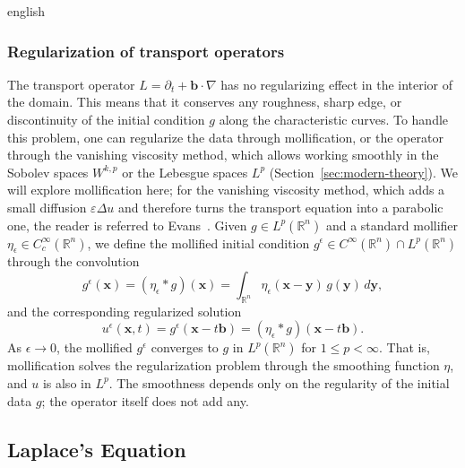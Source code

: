 \documentclass[11pt,letterpaper,twoside,openright]{book} %
\begin{document}
\begin{hyphenrules}{english}
\subsubsection{Regularization of transport operators}
The transport operator $L=\partial_t+\mathbf{b}\cdot\nabla$ has no regularizing effect in the interior of the
domain. This means that it conserves any roughness, sharp edge, or discontinuity of the initial
condition $g$ along the characteristic curves. To handle this problem, one can regularize the data
through mollification, or the operator through the vanishing viscosity method, which allows working
smoothly in the Sobolev spaces $W^{k,p}$ or the Lebesgue spaces $L^p$ (Section~\ref{sec:modern-theory}). We
will explore mollification here; for the vanishing viscosity method, which adds a small diffusion
$\varepsilon\Delta u$ and therefore turns the transport equation into a parabolic one, the reader is
referred to Evans~\cite{evans2010}. Given $g\in L^p(\mathbb{R}^n)$ and a standard mollifier
$\eta_\epsilon\in C_c^\infty(\mathbb{R}^n)$, we define the mollified initial condition
$g^\epsilon\in C^\infty(\mathbb{R}^n)\cap L^p(\mathbb{R}^n)$ through the convolution
\begin{equation}
  g^{\epsilon}(\mathbf{x})=(\eta_\epsilon*g)(\mathbf{x})=\int_{\mathbb{R}^n}\eta_\epsilon(\mathbf{x}-\mathbf{y})\,g(\mathbf{y})\,d\mathbf{y},
  \label{eq:mollifier}
\end{equation}
and the corresponding regularized solution
\begin{equation}
  u^{\epsilon}(\mathbf{x},t)=g^{\epsilon}(\mathbf{x}-t\mathbf{b})=(\eta_\epsilon*g)(\mathbf{x}-t\mathbf{b}).
  \label{eq:transport-mollified}
\end{equation}
As $\epsilon\to0$, the mollified $g^\epsilon$ converges to $g$ in $L^p(\mathbb{R}^n)$ for $1\le p<\infty$. That
is, mollification solves the regularization problem through the smoothing function $\eta$, and $u$ is also in $L^p$. The
smoothness depends only on the regularity of the initial data $g$; the operator itself does not add any.
\subsection{Laplace's Equation}\label{subsec:laplace}


\end{hyphenrules}
\end{document}
